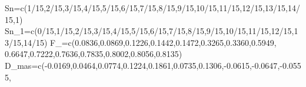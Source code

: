 \documentclass[
  a4paper,
  oneside,
  openany]{book}
\newenvironment{Shaded}{\begin{snugshade}}{\end{snugshade}}
\newcommand{\DecValTok}[1]{\textcolor[rgb]{0.00,0.00,0.81}{#1}}
\newcommand{\FloatTok}[1]{\textcolor[rgb]{0.00,0.00,0.81}{#1}}
\newcommand{\FunctionTok}[1]{\textcolor[rgb]{0.00,0.00,0.00}{#1}}
\newcommand{\NormalTok}[1]{#1}
\newcommand{\OtherTok}[1]{\textcolor[rgb]{0.56,0.35,0.01}{#1}}
\newcommand{\SpecialCharTok}[1]{\textcolor[rgb]{0.00,0.00,0.00}{#1}}
\begin{document}
\begin{Shaded}
\begin{Highlighting}[]
\NormalTok{Sn}\OtherTok{=}\FunctionTok{c}\NormalTok{(}\DecValTok{1}\SpecialCharTok{/}\DecValTok{15}\NormalTok{,}\DecValTok{2}\SpecialCharTok{/}\DecValTok{15}\NormalTok{,}\DecValTok{3}\SpecialCharTok{/}\DecValTok{15}\NormalTok{,}\DecValTok{4}\SpecialCharTok{/}\DecValTok{15}\NormalTok{,}\DecValTok{5}\SpecialCharTok{/}\DecValTok{15}\NormalTok{,}\DecValTok{6}\SpecialCharTok{/}\DecValTok{15}\NormalTok{,}\DecValTok{7}\SpecialCharTok{/}\DecValTok{15}\NormalTok{,}\DecValTok{8}\SpecialCharTok{/}\DecValTok{15}\NormalTok{,}\DecValTok{9}\SpecialCharTok{/}\DecValTok{15}\NormalTok{,}\DecValTok{10}\SpecialCharTok{/}\DecValTok{15}\NormalTok{,}\DecValTok{11}\SpecialCharTok{/}\DecValTok{15}\NormalTok{,}\DecValTok{12}\SpecialCharTok{/}\DecValTok{15}\NormalTok{,}\DecValTok{13}\SpecialCharTok{/}\DecValTok{15}\NormalTok{,}\DecValTok{14}\SpecialCharTok{/}\DecValTok{15}\NormalTok{,}\DecValTok{1}\NormalTok{)}
\NormalTok{Sn\_1}\OtherTok{=}\FunctionTok{c}\NormalTok{(}\DecValTok{0}\SpecialCharTok{/}\DecValTok{15}\NormalTok{,}\DecValTok{1}\SpecialCharTok{/}\DecValTok{15}\NormalTok{,}\DecValTok{2}\SpecialCharTok{/}\DecValTok{15}\NormalTok{,}\DecValTok{3}\SpecialCharTok{/}\DecValTok{15}\NormalTok{,}\DecValTok{4}\SpecialCharTok{/}\DecValTok{15}\NormalTok{,}\DecValTok{5}\SpecialCharTok{/}\DecValTok{15}\NormalTok{,}\DecValTok{6}\SpecialCharTok{/}\DecValTok{15}\NormalTok{,}\DecValTok{7}\SpecialCharTok{/}\DecValTok{15}\NormalTok{,}\DecValTok{8}\SpecialCharTok{/}\DecValTok{15}\NormalTok{,}\DecValTok{9}\SpecialCharTok{/}\DecValTok{15}\NormalTok{,}\DecValTok{10}\SpecialCharTok{/}\DecValTok{15}\NormalTok{,}\DecValTok{11}\SpecialCharTok{/}\DecValTok{15}\NormalTok{,}\DecValTok{12}\SpecialCharTok{/}\DecValTok{15}\NormalTok{,}\DecValTok{13}\SpecialCharTok{/}\DecValTok{15}\NormalTok{,}\DecValTok{14}\SpecialCharTok{/}\DecValTok{15}\NormalTok{)}
\NormalTok{F\_}\OtherTok{=}\FunctionTok{c}\NormalTok{(}\FloatTok{0.0836}\NormalTok{,}\FloatTok{0.0869}\NormalTok{,}\FloatTok{0.1226}\NormalTok{,}\FloatTok{0.1442}\NormalTok{,}\FloatTok{0.1472}\NormalTok{,}\FloatTok{0.3265}\NormalTok{,}\FloatTok{0.3360}\NormalTok{,}\FloatTok{0.5949}\NormalTok{,}
                    \FloatTok{0.6647}\NormalTok{,}\FloatTok{0.7222}\NormalTok{,}\FloatTok{0.7636}\NormalTok{,}\FloatTok{0.7835}\NormalTok{,}\FloatTok{0.8002}\NormalTok{,}\FloatTok{0.8056}\NormalTok{,}\FloatTok{0.8135}\NormalTok{)}
\NormalTok{D\_mas}\OtherTok{=}\FunctionTok{c}\NormalTok{(}\SpecialCharTok{{-}}\FloatTok{0.0169}\NormalTok{,}\FloatTok{0.0464}\NormalTok{,}\FloatTok{0.0774}\NormalTok{,}\FloatTok{0.1224}\NormalTok{,}\FloatTok{0.1861}\NormalTok{,}\FloatTok{0.0735}\NormalTok{,}\FloatTok{0.1306}\NormalTok{,}\SpecialCharTok{{-}}\FloatTok{0.0615}\NormalTok{,}\SpecialCharTok{{-}}\FloatTok{0.0647}\NormalTok{,}\SpecialCharTok{{-}}\FloatTok{0.0555}\NormalTok{,}

\end{Highlighting}
\end{Shaded}
\end{document}
